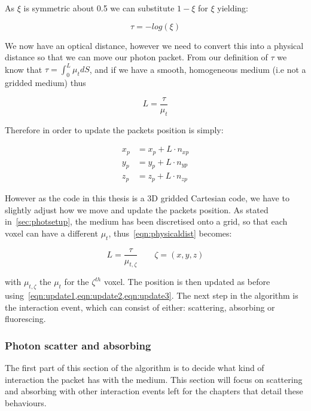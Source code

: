 As $\xi$ is symmetric about 0.5 we can substitute $1-\xi$ for $\xi$ yielding:

\begin{equation}
\tau=-log(\xi)\label{eqn:taueqn}
\end{equation} 

We now have an optical distance, however we need to convert this into a physical distance so that we can move our photon packet. From our definition of $\tau$ we know that $\tau=\int_0^L\mu_tdS$, and if we have a smooth, homogeneous medium (i.e not a gridded medium) thus 

\begin{equation}
L=\frac{\tau}{\mu_t}\label{eqn:physicaldist}
\end{equation}

Therefore in order to update the packets position is simply:

\begin{align}
x_p &= x_p+L\cdot n_{xp}\label{eqn:update1}\\
y_p &= y_p+L\cdot n_{yp}\label{eqn:update2}\\
z_p &= z_p+L\cdot n_{zp}\label{eqn:update3}
\end{align}

However as the code in this thesis is a 3D gridded Cartesian code, we have to slightly adjust how we move and update the packets position. As stated in~\cref{sec:photsetup}, the medium has been discretised onto a grid, so that each voxel can have a different $\mu_t$, thus~\cref{eqn:physicaldist} becomes:

\begin{equation}
L=\frac{\tau}{\mu_{t,\zeta}}\quad\quad \zeta=(x,y,z)
\end{equation}

with $\mu_{t,\zeta}$ the $\mu_t$ for the $\zeta^{th}$ voxel. The position is then updated as before using~\cref{eqn:update1,eqn:update2,eqn:update3}. The next step in the algorithm is the interaction event, which can consist of either: scattering, absorbing or fluorescing.

\subsubsection{Photon scatter and absorbing}\label{sec:photscatterabsorb}

The first part of this section of the algorithm is to decide what kind of interaction the packet has with the medium. This section will focus on scattering and absorbing with other interaction events left for the chapters that detail these behaviours.
\medskip

